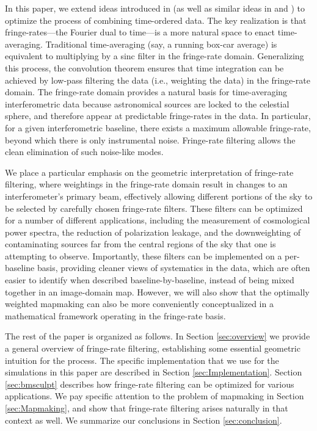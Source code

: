 \documentclass[twocolumn,apj,numberedappendix]{emulateapj}
\begin{document}
In this paper, we extend ideas introduced in \citet{parsons_backer2009} (as well as similar ideas in \citealt{offringa_et_al2012} and \citealt{shaw_et_al2013}) to optimize the process of combining time-ordered data. The key realization is that fringe-rates---the Fourier dual to time---is a
more natural space to enact time-averaging. Traditional time-averaging (say, a running box-car average)
is equivalent to multiplying by a sinc filter in the fringe-rate domain. Generalizing this process, the
convolution theorem ensures that time integration can be achieved by low-pass filtering the data (i.e.,
weighting the data) in the fringe-rate domain. The fringe-rate domain provides a natural basis for time-averaging interferometric
data because astronomical sources are locked to the celestial sphere, and therefore appear at
predictable fringe-rates in the data. In particular, for a given interferometric baseline, there exists
a maximum allowable fringe-rate, beyond which there is only instrumental noise. Fringe-rate filtering
allows the clean elimination of such noise-like modes.

We place a particular emphasis on the geometric interpretation of fringe-rate filtering,
where weightings in the fringe-rate domain result in changes to an interferometer's primary beam,
effectively allowing different portions of the sky to be selected by carefully chosen fringe-rate filters.
These filters can be optimized for a number of different applications, including the measurement
of cosmological power spectra, the reduction of polarization leakage, and the downweighting of
contaminating sources far from the central regions of the sky that one is attempting to observe.
Importantly, these filters can be implemented on a per-baseline basis, providing cleaner views
of systematics in the data, which are often easier to identify when described baseline-by-baseline,
instead of being mixed together in an image-domain map. However, we will also show that the
optimally weighted mapmaking can also be more conveniently conceptualized in a mathematical
framework operating in the fringe-rate basis.

The rest of the paper is organized as follows. In Section \ref{sec:overview} we provide a general
overview of fringe-rate filtering, establishing some essential geometric intuition for the process. The
specific implementation that we use for the simulations in this paper are described in Section
\ref{sec:Implementation}. Section \ref{sec:bmsculpt} describes how fringe-rate filtering can be
optimized for various applications. We pay specific attention to the problem of mapmaking in
Section \ref{sec:Mapmaking}, and show that fringe-rate filtering arises naturally in that context as well.
We summarize our conclusions in Section \ref{sec:conclusion}.
\end{document}
